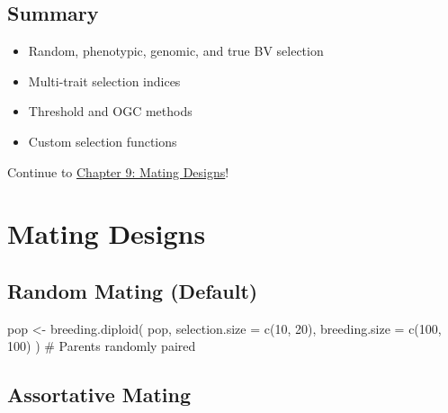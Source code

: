\documentclass[
  letterpaper,
]{book}
\newenvironment{Shaded}{\begin{snugshade}}{\end{snugshade}}
\newcommand{\AttributeTok}[1]{\textcolor[rgb]{0.40,0.45,0.13}{#1}}
\newcommand{\CommentTok}[1]{\textcolor[rgb]{0.37,0.37,0.37}{#1}}
\newcommand{\DecValTok}[1]{\textcolor[rgb]{0.68,0.00,0.00}{#1}}
\newcommand{\FunctionTok}[1]{\textcolor[rgb]{0.28,0.35,0.67}{#1}}
\newcommand{\NormalTok}[1]{\textcolor[rgb]{0.00,0.23,0.31}{#1}}
\newcommand{\OtherTok}[1]{\textcolor[rgb]{0.00,0.23,0.31}{#1}}
\providecommand{\tightlist}{%
  \setlength{\itemsep}{0pt}\setlength{\parskip}{0pt}}
\begin{document}
\section{Summary}\label{summary-7}

\begin{itemize}
\tightlist
\item
  Random, phenotypic, genomic, and true BV selection
\item
  Multi-trait selection indices
\item
  Threshold and OGC methods
\item
  Custom selection functions
\end{itemize}

Continue to \href{09-mating-designs.qmd}{Chapter 9: Mating Designs}!

\chapter{Mating Designs}\label{sec-mating-designs}

\section{Random Mating (Default)}\label{random-mating-default}

\begin{Shaded}
\begin{Highlighting}[]
\NormalTok{pop }\OtherTok{\textless{}{-}} \FunctionTok{breeding.diploid}\NormalTok{(}
\NormalTok{  pop,}
  \AttributeTok{selection.size =} \FunctionTok{c}\NormalTok{(}\DecValTok{10}\NormalTok{, }\DecValTok{20}\NormalTok{),}
  \AttributeTok{breeding.size =} \FunctionTok{c}\NormalTok{(}\DecValTok{100}\NormalTok{, }\DecValTok{100}\NormalTok{)}
\NormalTok{)}
\CommentTok{\# Parents randomly paired}
\end{Highlighting}
\end{Shaded}

\section{Assortative Mating}\label{assortative-mating}
\end{document}
